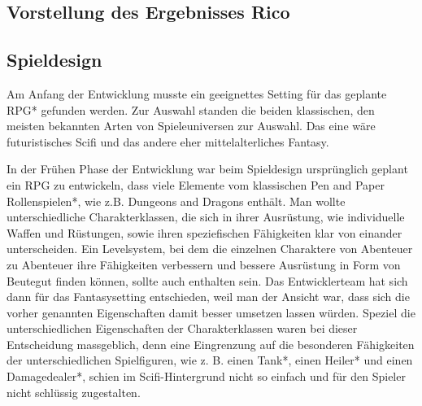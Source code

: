 

\subsection{Vorstellung des Ergebnisses Rico}


\subsection{Spieldesign} Am Anfang der Entwicklung musste ein geeignettes Setting für das geplante RPG* gefunden werden. Zur Auswahl standen die beiden klassischen, den meisten bekannten Arten von Spieleuniversen zur Auswahl. Das eine wäre futuristisches Scifi und das andere eher mittelalterliches Fantasy. 

In der Frühen Phase der Entwicklung war beim Spieldesign ursprünglich geplant ein RPG zu entwickeln, dass viele Elemente vom klassischen Pen and Paper Rollenspielen*, wie z.B. Dungeons and Dragons enthält. Man wollte unterschiedliche Charakterklassen, die sich in ihrer Ausrüstung, wie individuelle Waffen und Rüstungen, sowie ihren speziefischen Fähigkeiten klar von einander unterscheiden. Ein Levelsystem, bei dem die einzelnen Charaktere von Abenteuer zu Abenteuer ihre Fähigkeiten verbessern und bessere Ausrüstung in Form von Beutegut finden können, sollte auch enthalten sein. Das Entwicklerteam hat sich dann für das Fantasysetting entschieden, weil man der Ansicht war, dass sich die vorher genannten Eigenschaften damit besser umsetzen lassen würden. Speziel die unterschiedlichen Eigenschaften der Charakterklassen waren bei dieser Entscheidung massgeblich, denn eine Eingrenzung auf die besonderen Fähigkeiten der unterschiedlichen Spielfiguren, wie z. B. einen Tank*, einen Heiler* und einen Damagedealer*, schien im Scifi-Hintergrund nicht so einfach und für den Spieler nicht schlüssig zugestalten.

